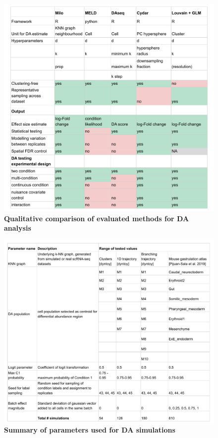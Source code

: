 \documentclass[
]{article}
\begin{document}
\begin{figure}
\centering
\includegraphics{suppl_tables/table_methods_comparison.pdf}
\caption{\label{fig:sup-tab-1}\textbf{Qualitative comparison of evaluated methods for DA analysis}}
\end{figure}



\begin{figure}
\centering
\includegraphics{suppl_tables/table_simulation_params.pdf}
\caption{\label{fig:sup-tab-2}\textbf{Summary of parameters used for DA simulations}}
\end{figure}
\end{document}
